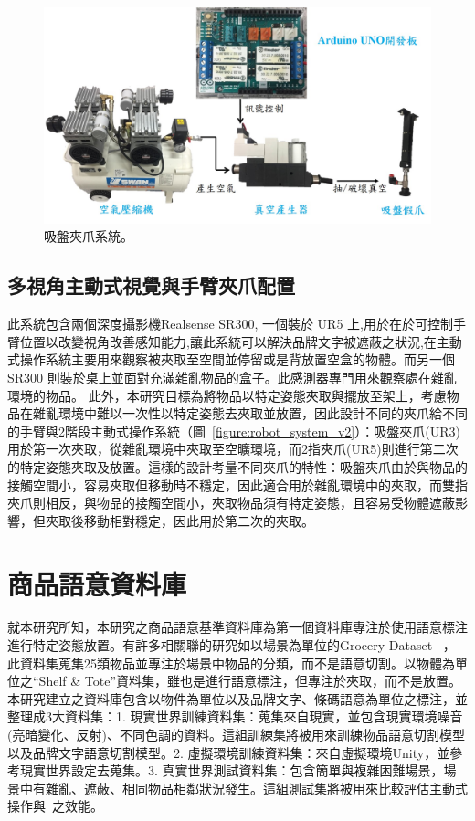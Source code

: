 \begin{figure}[H]
	\centering
	\includegraphics[height=!, width=1.0\linewidth, keepaspectratio=true]
	{./figures/suction_system.jpg}
  \caption{吸盤夾爪系統。}
  \label{figure:suction_gripper}
\end{figure}



\subsection{多視角主動式視覺與手臂夾爪配置}
此系統包含兩個深度攝影機Realsense SR300, 一個裝於 UR5 上,用於在於可控制手臂位置以改變視角改善感知能力,讓此系統可以解決品牌文字被遮蔽之狀況,在主動式操作系統主要用來觀察被夾取至空間並停留或是背放置空盒的物體。而另一個 SR300 則裝於桌上並面對充滿雜亂物品的盒子。此感測器專門用來觀察處在雜亂環境的物品。
此外，本研究目標為將物品以特定姿態夾取與擺放至架上，考慮物品在雜亂環境中難以一次性以特定姿態去夾取並放置，因此設計不同的夾爪給不同的手臂與2階段主動式操作系統（圖~\ref{figure:robot_system_v2}）：吸盤夾爪(UR3)用於第一次夾取，從雜亂環境中夾取至空曠環境，而2指夾爪(UR5)則進行第二次的特定姿態夾取及放置。這樣的設計考量不同夾爪的特性：吸盤夾爪由於與物品的接觸空間小，容易夾取但移動時不穩定，因此適合用於雜亂環境中的夾取，而雙指夾爪則相反，與物品的接觸空間小，夾取物品須有特定姿態，且容易受物體遮蔽影響，但夾取後移動相對穩定，因此用於第二次的夾取。


\section{商品語意資料庫}
就本研究所知，本研究之商品語意基準資料庫為第一個資料庫專注於使用語意標注進行特定姿態放置。有許多相關聯的研究如以場景為單位的Grocery Dataset ~\cite{jund2016freiburg}，此資料集蒐集25類物品並專注於場景中物品的分類，而不是語意切割。以物體為單位之``Shelf \& Tote''資料集，雖也是進行語意標注，但專注於夾取，而不是放置。本研究建立之資料庫包含以物件為單位以及品牌文字、條碼語意為單位之標注，並整理成3大資料集：1. 現實世界訓練資料集：蒐集來自現實，並包含現實環境噪音(亮暗變化、反射)、不同色調的資料。這組訓練集將被用來訓練物品語意切割模型以及品牌文字語意切割模型。2. 虛擬環境訓練資料集：來自虛擬環境Unity，並參考現實世界設定去蒐集。3. 真實世界測試資料集：包含簡單與複雜困難場景，場景中有雜亂、遮蔽、相同物品相鄰狀況發生。這組測試集將被用來比較評估主動式操作與~\cite{peterthesis}之效能。

